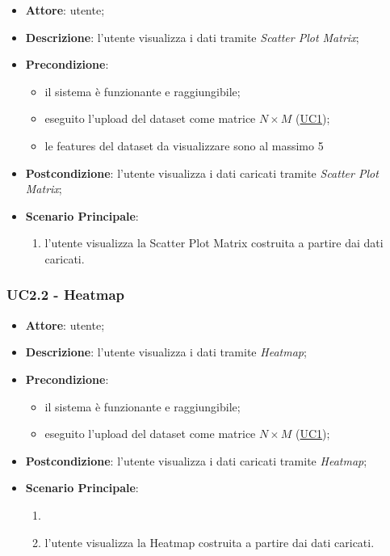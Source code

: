     \begin{itemize}
    \item \textbf{Attore}: utente;
    \item \textbf{Descrizione}: l'utente visualizza i dati tramite \emph{Scatter Plot Matrix};
    \item \textbf{Precondizione}:
    \begin{itemize}
        \item il sistema è funzionante e raggiungibile;
        \item eseguito l'upload del dataset come matrice $N\times M$ (\hyperref[uc1]{UC1});
        \item le features del dataset da visualizzare sono al massimo 5
    \end{itemize}
    \item \textbf{Postcondizione}: l'utente visualizza i dati caricati tramite \emph{Scatter Plot Matrix};
    \item \textbf{Scenario Principale}: 
        \begin{enumerate}
            \item l'utente visualizza la Scatter Plot Matrix costruita a partire dai dati caricati.
        \end{enumerate}
    \end{itemize}
    
    \subsubsection{UC2.2 - Heatmap}
    \label{uc2.2}
    
    \begin{itemize}
    \item \textbf{Attore}: utente;
    \item \textbf{Descrizione}: l'utente visualizza i dati tramite \emph{Heatmap};
    \item \textbf{Precondizione}:
    \begin{itemize}
        \item il sistema è funzionante e raggiungibile;
        \item eseguito l'upload del dataset come matrice $N\times M$ (\hyperref[uc1]{UC1});
    \end{itemize}
    \item \textbf{Postcondizione}: l'utente visualizza i dati caricati tramite \emph{Heatmap};
    \item \textbf{Scenario Principale}: 
        \begin{enumerate}
            \item \item l'utente visualizza la Heatmap costruita a partire dai dati caricati.
        \end{enumerate}
    \end{itemize}
    
